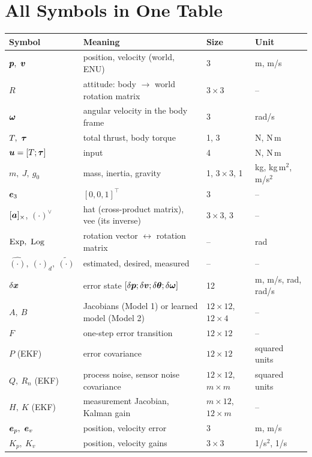 \section{All Symbols in One Table}
\label{app:symbols}

\begin{center}\small
\begin{tabularx}{\linewidth}{@{}l X l l@{}}
\toprule
\textbf{Symbol} & \textbf{Meaning} & \textbf{Size} & \textbf{Unit}\\
\midrule
$\vp,\ \vv$ & position, velocity (world, ENU) & 3 & m, m/s\\
$R$ & attitude: body $\rightarrow$ world rotation matrix & $3\times3$ & --\\
$\bm{\omega}$ & angular velocity in the body frame & 3 & rad/s\\
$T,\ \vtau$ & total thrust, body torque & 1, 3 & N, N\,m\\
$\bm{u}=[T;\bm{\tau}]$ & input & 4 & N, N\,m\\
$m,\ J,\ g_0$ & mass, inertia, gravity & 1, $3\times3$, 1 & kg, kg\,m$^2$, m/s$^2$\\
$\bm{e}_3$ & $[0,0,1]^\top$ & 3 & --\\
$[\bm a]_{\times}$, $(\cdot)^\vee$ & hat (cross-product matrix), vee (its inverse) & $3\times3$, 3 & --\\
$\Exp,\ \Log$ & rotation vector $\leftrightarrow$ rotation matrix & -- & rad\\
$\hat{(\cdot)},\ (\cdot)_d,\ \tilde{(\cdot)}$ & estimated, desired, measured & -- & --\\
$\delta\bm{x}$ & error state $[\delta\bm{p};\delta\bm{v};\delta\bm{\theta};\delta\bm{\omega}]$ & 12 & m, m/s, rad, rad/s\\
$A,\ B$ & Jacobians (Model 1) or learned model (Model 2) & $12\times12$, $12\times4$ & --\\
$F$ & one-step error transition & $12\times12$ & --\\
$P$ (EKF) & error covariance & $12\times12$ & squared units\\
$Q,\ R_n$ (EKF) & process noise, sensor noise covariance & $12\times12$, $m\times m$ & squared units\\
$H,\ K$ (EKF) & measurement Jacobian, Kalman gain & $m\times12$, $12\times m$ & --\\
$\ve_p,\ \ve_v$ & position, velocity error & 3 & m, m/s\\
$K_p,\ K_v$ & position, velocity gains & $3\times3$ & 1/s$^2$, 1/s\\

\end{tabularx}
\end{center}

